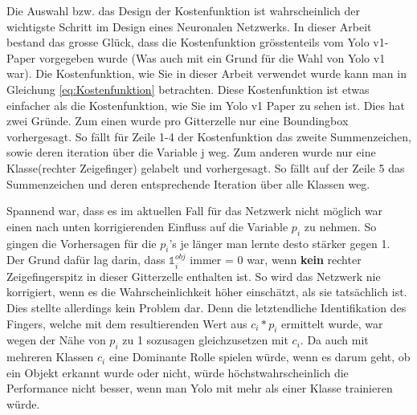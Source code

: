 Die Auswahl bzw. das Design der Kostenfunktion ist wahrscheinlich der wichtigste Schritt im Design eines Neuronalen Netzwerks. 
In dieser Arbeit bestand das grosse Glück, dass die Kostenfunktion grösstenteils vom Yolo v1-Paper \cite{yolo} vorgegeben wurde (Was auch mit ein Grund für die Wahl von Yolo v1 war).
Die Kostenfunktion, wie Sie in dieser Arbeit verwendet wurde kann man in Gleichung \ref{eq:Kostenfunktion} betrachten. 
Diese Kostenfunktion ist etwas einfacher als die Kostenfunktion, wie Sie im Yolo v1 Paper zu sehen ist. 
Dies hat zwei Gründe. 
Zum einen wurde pro Gitterzelle nur eine Boundingbox vorhergesagt. 
So fällt für Zeile 1-4 der Kostenfunktion das zweite Summenzeichen, sowie deren iteration über die Variable j weg. 
Zum anderen wurde nur eine Klasse(rechter Zeigefinger) gelabelt und vorhergesagt.
So fällt auf der Zeile 5 das Summenzeichen und deren entsprechende Iteration über alle Klassen weg.

Spannend war, dass es im aktuellen Fall für das Netzwerk nicht möglich war einen nach unten korrigierenden Einfluss auf die Variable $p_i$ zu nehmen.
So gingen die Vorhersagen für die $p_i$'s je länger man lernte desto stärker gegen 1.  
Der Grund dafür lag darin, dass $\mathds{1}_{i}^{obj}$ immer = 0 war, wenn \textbf{kein} rechter Zeigefingerspitz in dieser Gitterzelle enthalten ist.
So wird das Netzwerk nie korrigiert, wenn es die Wahrscheinlichkeit höher einschätzt, als sie tatsächlich ist. 
Dies stellte allerdings kein Problem dar. 
Denn die letztendliche Identifikation des Fingers, welche mit dem resultierenden Wert aus $c_i * p_i$ ermittelt wurde, war wegen der Nähe von $p_i$ zu 1 sozusagen gleichzusetzen mit $c_i$.
Da auch mit mehreren Klassen $c_i$ eine Dominante Rolle spielen würde, wenn es darum geht, ob ein Objekt erkannt wurde oder nicht, würde höchstwahrscheinlich die Performance nicht besser, wenn man Yolo mit mehr als einer Klasse trainieren würde.






 


